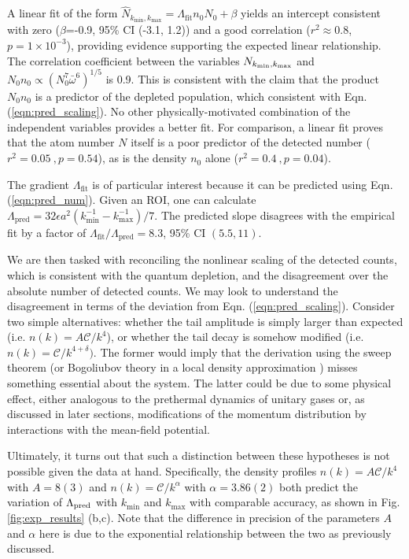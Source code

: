 	A linear fit of the form $\hat{N}_{k_\textrm{min},k_\textrm{max}} = \Lambda_\textrm{fit} n_0 N_0 + \beta$ yields {an intercept} %
	consistent with zero ($\beta$=-0.9,  95\% CI (-3.1, 1.2)) and a good correlation ($r^2\approx0.8$, $p=1\times10^{-3}$), providing evidence supporting the expected linear relationship. 
	The correlation coefficient between the %
	variables {$N_{k_{\rm min},k_{\rm max}}$} %
	and $N_0n_0\propto(N_0^7\bar{\omega}^6)^{1/5}$ is 0.9.
	This is consistent with the claim that the product $N_0n_0$ is a predictor of the depleted population, which consistent with Eqn. (\ref{eqn:pred_scaling}).
	No other physically-motivated combination of the independent variables provides a better fit.
	For comparison, a linear fit proves that the atom number {$N$} itself is a poor predictor of the detected number ($r^2=0.05~,p=0.54$), as is the density {$n_0$} alone ($r^2=0.4~,p=0.04$).

	The gradient $\Lambda_\textrm{fit}$ is of particular interest because it can be predicted using Eqn. (\ref{eqn:pred_num}).
	Given an ROI, one can calculate $\Lambda_\textrm{pred} = 32\epsilon a^2(k_{\textrm{min}}^{-1}-k_{\textrm{max}}^{-1})/7$.
	The predicted slope disagrees with the empirical fit by a factor of $\Lambda_\textrm{fit}/\Lambda_\textrm{pred}= 8.3$, 95\% CI $(5.5,11)$.

	We are then tasked with reconciling the nonlinear scaling of the detected counts, which is consistent with the quantum depletion, and the disagreement over the absolute number of detected counts.
	We may look to understand the disagreement in terms of the deviation from Eqn. (\ref{eqn:pred_scaling}).
	Consider two simple alternatives: whether the tail amplitude is simply larger than expected (i.e. $n(k)=A\mathcal{C}/k^4$), or whether the tail decay is somehow modified (i.e. $n(k)=\mathcal{C}/k^{4+\delta})$.
	The former would imply that the derivation using the sweep theorem (or Bogoliubov theory in a local density approximation \cite{Chang16}) misses something essential about the system.
	The latter could be due to some physical effect, either analogous to the prethermal dynamics of unitary gases \cite{Makotyn14,Eigen18,Colussi20,Kira15_coherent,Smith14} or, as discussed in later sections, modifications of the momentum distribution by interactions with the mean-field potential.
	
	Ultimately, {it turns out that} such a distinction between these hypotheses is not possible given the data at hand. 
	Specifically, the density profiles $n(k)=A\mathcal{C}/k^4$ with $A=8(3)$ and $n(k)=\mathcal{C}/k^{\alpha}$ with $\alpha=3.86(2)$ both predict the variation of $\Lambda_{\rm pred}$ with $k_\textrm{min}$ and $k_\textrm{max}$ with comparable accuracy, as shown in Fig. \ref{fig:exp_results} (b,c). 
	Note that the difference in precision of the parameters $A$ and $\alpha$ here is due to the exponential relationship between the two as previously discussed.

